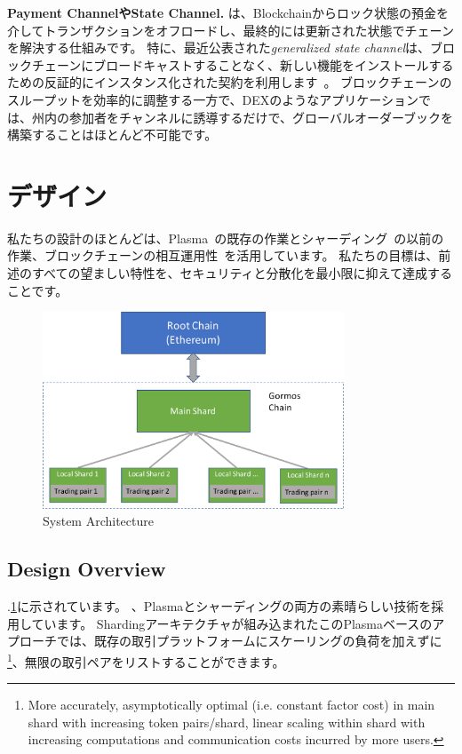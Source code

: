 \textbf{Payment ChannelやState Channel.}\cite{lightning, miller2017sprites} は、Blockchainからロック状態の預金を介してトランザクションをオフロードし、最終的には更新された状態でチェーンを解決する仕組みです。 特に、最近公表された\textit{generalized state channel}は、ブロックチェーンにブロードキャストすることなく、新しい機能をインストールするための反証的にインスタンス化された契約を利用します~\cite{Coleman2018, Dziembowski2018}。 ブロックチェーンのスループットを効率的に調整する一方で、DEXのようなアプリケーションでは、州内の参加者をチャンネルに誘導するだけで、グローバルオーダーブックを構築することはほとんど不可能です。


\section{デザイン}

私たちの設計のほとんどは、Plasma~\cite{plasma}の既存の作業とシャーディング~\cite{elastico}の以前の作業、ブロックチェーンの相互運用性~\cite{peacerelay}を活用しています。 私たちの目標は、前述のすべての望ましい特性を、セキュリティと分散化を最小限に抑えて達成することです。


\begin{figure}[t]
  \centering
  \includegraphics[width=0.8\textwidth]{images//architecture}
  \caption{\codename System Architecture}
  \label{architecture}
\end{figure}


\subsection{Design Overview}

.\ref{architecture}に示されています。 、Plasmaとシャーディングの両方の素晴らしい技術を採用しています。 Shardingアーキテクチャが組み込まれたこのPlasmaベースのアプローチでは、既存の取引プラットフォームにスケーリングの負荷を加えずに\footnote{More accurately, asymptotically optimal (i.e. constant factor cost) in main shard with increasing token pairs/shard, linear scaling within shard with increasing computations and communication costs incurred by more users.}、無限の取引ペアをリストすることができます。

